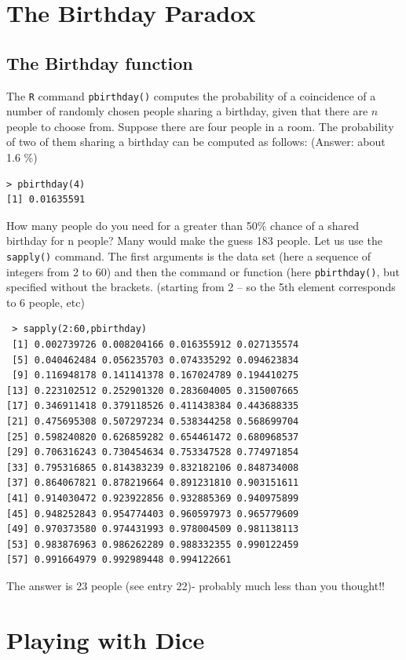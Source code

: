 \documentclass[11pt]{article} %
\begin{document}
\newpage
\section{The Birthday Paradox}
\subsection{The Birthday function}
The \texttt{R} command \texttt{pbirthday()} computes the probability of a coincidence of a number of randomly chosen people sharing a birthday, given that there are $n$ people to choose from.
Suppose there are four people in a room. The probability of two of them sharing a birthday can be computed as follows: (Answer:  about 1.6 \%)
\begin{verbatim}
> pbirthday(4)
[1] 0.01635591
\end{verbatim}



\noindent How many people do you need for a greater than 50\% chance of a shared birthday for n people? Many would make the guess 183 people.  Let us use the \texttt{sapply()} command. The first arguments is the data set (here a sequence of integers from 2 to 60) and then the command or function (here \texttt{pbirthday()}, but specified without the brackets.
(starting from 2 – so the 5th element corresponds to 6 people, etc)
\begin{verbatim}
 > sapply(2:60,pbirthday)
 [1] 0.002739726 0.008204166 0.016355912 0.027135574
 [5] 0.040462484 0.056235703 0.074335292 0.094623834
 [9] 0.116948178 0.141141378 0.167024789 0.194410275
[13] 0.223102512 0.252901320 0.283604005 0.315007665
[17] 0.346911418 0.379118526 0.411438384 0.443688335
[21] 0.475695308 0.507297234 0.538344258 0.568699704
[25] 0.598240820 0.626859282 0.654461472 0.680968537
[29] 0.706316243 0.730454634 0.753347528 0.774971854
[33] 0.795316865 0.814383239 0.832182106 0.848734008
[37] 0.864067821 0.878219664 0.891231810 0.903151611
[41] 0.914030472 0.923922856 0.932885369 0.940975899
[45] 0.948252843 0.954774403 0.960597973 0.965779609
[49] 0.970373580 0.974431993 0.978004509 0.981138113
[53] 0.983876963 0.986262289 0.988332355 0.990122459
[57] 0.991664979 0.992989448 0.994122661
\end{verbatim}
The answer is 23 people (see entry 22)- probably much less than you thought!!
\newpage
\section{Playing with Dice}
\end{document}
